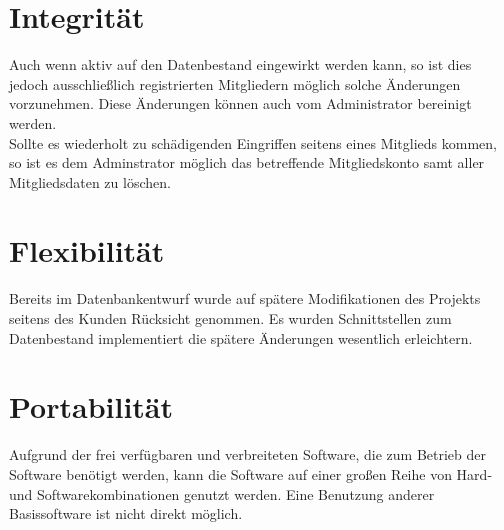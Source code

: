 \section{Integrität}
Auch wenn aktiv auf den Datenbestand eingewirkt werden kann, so ist dies jedoch ausschlie\ss lich registrierten Mitgliedern m\"oglich solche \"Anderungen vorzunehmen.
Diese \"Anderungen k\"onnen auch vom Administrator bereinigt werden.\\
Sollte es wiederholt zu sch\"adigenden Eingriffen seitens eines Mitglieds kommen, so ist es dem Adminstrator möglich das betreffende Mitgliedskonto samt aller Mitgliedsdaten zu l\"oschen.

\section{Flexibilität}
Bereits im Datenbankentwurf wurde auf sp\"atere Modifikationen des Projekts seitens des Kunden R\"ucksicht genommen. Es wurden Schnittstellen zum Datenbestand implementiert die sp\"atere \"Anderungen wesentlich erleichtern. \\

\section{Portabilität}
Aufgrund der frei verfügbaren und verbreiteten Software, die zum Betrieb der Software benötigt werden, kann die Software auf einer großen Reihe von Hard- und Softwarekombinationen genutzt werden. Eine Benutzung anderer Basissoftware ist nicht direkt möglich.
